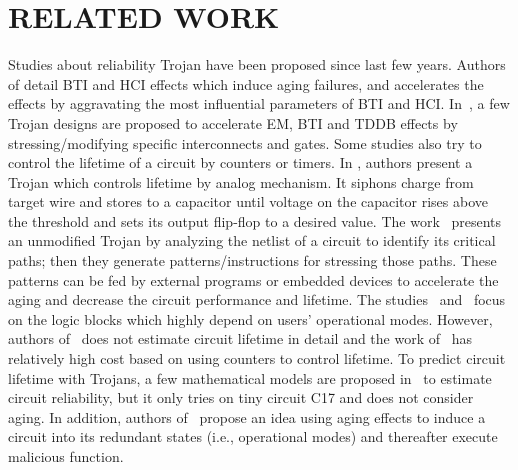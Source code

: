 \section{RELATED WORK}
\label{sec:related}
Studies about reliability Trojan have been proposed since last few years. Authors of \cite{shiyanovskii2010process} detail BTI and HCI effects which induce aging failures, and accelerates the effects by aggravating the most influential parameters of BTI and HCI. In~\cite{sreedhar2012reliability}, a few Trojan designs are proposed to accelerate EM, BTI and TDDB effects by stressing/modifying specific interconnects and gates. Some studies also try to control the lifetime of a circuit by counters or timers. In \cite{yang2016a2}, authors present a Trojan which controls lifetime by analog mechanism. It siphons charge from target wire and stores to a capacitor until voltage on the capacitor rises above the threshold and sets its output flip-flop to a desired value.  The work~\cite{karimi2015magic} presents an unmodified Trojan by analyzing the netlist of a circuit to identify its critical paths; then they generate patterns/instructions for stressing those paths. These patterns can be fed by external programs or embedded devices to accelerate the aging and decrease the circuit performance and lifetime. The studies~\cite{yang2016a2} and~\cite{karimi2015magic} focus on the logic blocks which highly depend on users' operational modes. However, authors of~\cite{shiyanovskii2010process} does not estimate circuit lifetime in detail and the work of~\cite{sreedhar2012reliability} has relatively high cost based on using counters to control lifetime. To predict circuit lifetime with Trojans, a few mathematical models are proposed in~\cite{burman2012effect} to estimate circuit reliability, but it only tries on tiny circuit C17 and does not consider aging. In addition, authors of~\cite{wei2013undetectable} propose an idea using aging effects to induce a circuit into its redundant states (i.e., operational modes) and thereafter execute malicious function.

